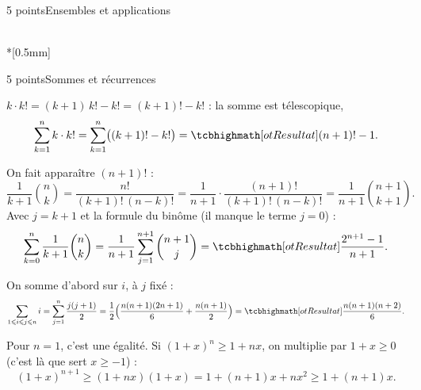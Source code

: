 \begin{corrigeEval}{5 points}{Ensembles et applications}
\begin{center}
\begin{minipage}{\linewidth}
\\*[0.5mm]
\end{minipage}\end{center}
\end{corrigeEval}

\begin{corrigeEval}{5 points}{Sommes et récurrences}
\begin{questions}
  \item $k\cdot k!=(k+1)\,k!-k!=(k+1)!-k!$ : la somme est télescopique,
    \[\sum_{k=1}^{n}k\cdot k!=\sum_{k=1}^{n}\bigl((k+1)!-k!\bigr)=\res{(n+1)!-1}.\]
    \pts{1 pt}
  \item On fait apparaître $(n+1)!$ :
    \[\frac{1}{k+1}\binom nk=\frac{n!}{(k+1)!\,(n-k)!}
      =\frac{1}{n+1}\cdot\frac{(n+1)!}{(k+1)!\,(n-k)!}=\frac{1}{n+1}\binom{n+1}{k+1}.\]
    Avec $j=k+1$ et la formule du binôme (il manque le terme $j=0$) :
    \[\sum_{k=0}^{n}\frac{1}{k+1}\binom nk=\frac{1}{n+1}\sum_{j=1}^{n+1}\binom{n+1}{j}
      =\res{\frac{2^{n+1}-1}{n+1}}.\]
  \item On somme d'abord sur $i$, à $j$ fixé :
    \[\sum_{1\leqslant i\leqslant j\leqslant n}i=\sum_{j=1}^{n}\frac{j(j+1)}{2}
      =\frac12\Bigl(\frac{n(n+1)(2n+1)}{6}+\frac{n(n+1)}{2}\Bigr)
      =\res{\frac{n(n+1)(n+2)}{6}}.\]
  \item Pour $n=1$, c'est une égalité. Si $(1+x)^{n}\geqslant1+nx$, on
    multiplie par $1+x\geqslant0$ (c'est là que sert $x\geqslant-1$) :
    \[(1+x)^{n+1}\geqslant(1+nx)(1+x)=1+(n+1)x+nx^{2}\geqslant1+(n+1)x.\]
    \pts{1 pt}
\end{questions}
\end{corrigeEval}

